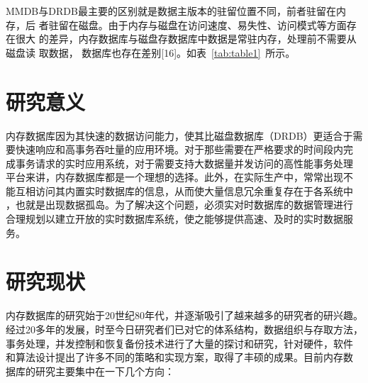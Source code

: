 \documentclass[literaturereview]{zjutreport}
\begin{document}
MMDB与DRDB最主要的区别就是数据主版本的驻留位置不同，前者驻留在内存，后
者驻留在磁盘。由于内存与磁盘在访问速度、易失性、访问模式等方面存在很大
的差异，内存数据库与磁盘存数据库中数据是常驻内存，处理前不需要从磁盘读
取数据， 数据库也存在差别[16]。如表~\ref{tab:table1}~所示。

\begin{table}[htbp]
\caption{MMDB和DRDB的比较}\label{tab:table1}
\vspace{\baselineskip}
\end{table}

\chapter{研究意义}
内存数据库因为其快速的数据访问能力，使其比磁盘数据库（DRDB）更适合于需
要快速响应和高事务吞吐量的应用环境。对于那些需要在严格要求的时间段内完
成事务请求的实时应用系统，对于需要支持大数据量并发访问的高性能事务处理
平台来讲，内存数据库都是一个理想的选择。此外，在实际生产中，常常出现不
能互相访问其内置实时数据库的信息，从而使大量信息冗余重复存在于各系统中
，也就是出现数据孤岛。为了解决这个问题，必须实对时数据库的数据管理进行
合理规划以建立开放的实时数据库系统，使之能够提供高速、及时的实时数据服
务。

\chapter{研究现状}
内存数据库的研究始于20世纪80年代，并逐渐吸引了越来越多的研究者的研兴趣。
经过20多年的发展，时至今日研究者们已对它的体系结构，数据组织与存取方法，
事务处理，并发控制和恢复备份技术进行了大量的探讨和研究，针对硬件，软件
和算法设计提出了许多不同的策略和实现方案，取得了丰硕的成果。目前内存数
据库的研究主要集中在一下几个方向：
\end{document}
